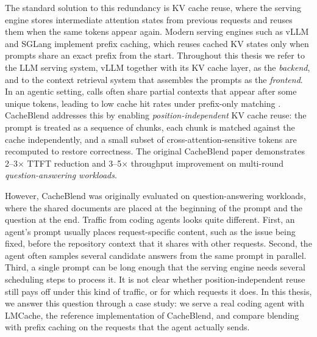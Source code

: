 The standard solution to this redundancy is KV cache reuse, where the serving engine stores intermediate attention states from previous requests and reuses them when the same tokens appear again. Modern serving engines such as vLLM \cite{kwon2023vllm} and SGLang \cite{zheng2024sglangefficientexecutionstructured} implement prefix caching, which reuses cached KV states only when prompts share an exact prefix from the start. Throughout this thesis we refer to the LLM serving system, vLLM together with its KV cache layer, as the \emph{backend}, and to the context retrieval system that assembles the prompts as the \emph{frontend}. In an agentic setting, calls often share partial contexts that appear after some unique tokens, leading to low cache hit rates under prefix-only matching \cite{kwon2023vllm, zheng2024sglangefficientexecutionstructured}. CacheBlend \cite{yao2025cacheblendfastlargelanguage} addresses this by enabling \emph{position-independent} KV cache reuse: the prompt is treated as a sequence of chunks, each chunk is matched against the cache independently, and a small subset of cross-attention-sensitive tokens are recomputed to restore correctness. The original CacheBlend paper demonstrates 2--3$\times$ TTFT reduction and 3--5$\times$ throughput improvement on multi-round \textit{question-answering workloads}.

However, CacheBlend was originally evaluated on question-answering workloads, where the shared documents are placed at the beginning of the prompt and the question at the end. Traffic from coding agents looks quite different. First, an agent's prompt usually places request-specific content, such as the issue being fixed, before the repository context that it shares with other requests. Second, the agent often samples several candidate answers from the same prompt in parallel. Third, a single prompt can be long enough that the serving engine needs several scheduling steps to process it. It is not clear whether position-independent reuse still pays off under this kind of traffic, or for which requests it does. In this thesis, we answer this question through a case study: we serve a real coding agent with LMCache, the reference implementation of CacheBlend, and compare blending with prefix caching on the requests that the agent actually sends.

